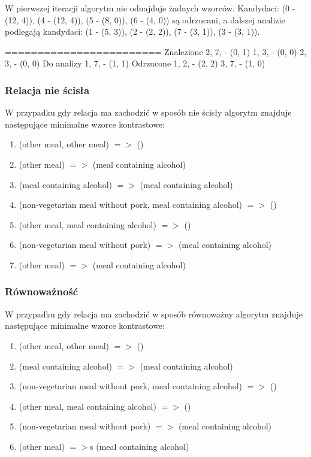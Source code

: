 \documentclass[a4paper,12pt]{article}
\begin{document}
W pierwszej iteracji algorytm nie odnajduje żadnych wzorców. Kandydaci: (0 - (12, 4)), (4 - (12, 4)), (5 - (8, 0)), (6 - (4, 0)) są odrzucani,
a dalszej analizie podlegają kandydaci: (1 - (5, 3)), (2 - (2, 2)), (7 - (3, 1)), (3 - (3, 1)).

========================
Znalezione
2, 7,  - (0, 1)
1, 3,  - (0, 0)
2, 3,  - (0, 0)
Do analizy
1, 7,  - (1, 1)
Odrzucone
1, 2,  - (2, 2)
3, 7,  - (1, 0)

\subsubsection{Relacja nie ścisła}

W przypadku gdy relacja ma zachodzić w sposób nie ścisły algorytm znajduje następujące minimalne wzorce kontrastowe:

\begin{enumerate}
\item (other meal, other meal) $=>$ ()
\item (other meal) $=>$ (meal containing alcohol)
\item (meal containing alcohol) $=>$ (meal containing alcohol)
\item (non-vegetarian meal without pork, meal containing alcohol) $=>$ ()
\item (other meal, meal containing alcohol) $=>$ ()
\item (non-vegetarian meal without pork) $=>$ (meal containing alcohol)
\item (other meal) $=>$ (meal containing alcohol)
\end{enumerate}

\subsubsection{Równoważność}

W przypadku gdy relacja ma zachodzić w sposób równoważny algorytm znajduje następujące minimalne wzorce kontrastowe:

\begin{enumerate}
\item (other meal, other meal) $=>$ ()
\item (meal containing alcohol) $=>$ (meal containing alcohol)
\item (non-vegetarian meal without pork, meal containing alcohol) $=>$ ()
\item (other meal, meal containing alcohol) $=>$ ()
\item (non-vegetarian meal without pork) $=>$ (meal containing alcohol)
\item (other meal) $=>$s (meal containing alcohol)
\end{enumerate}
\end{document}
